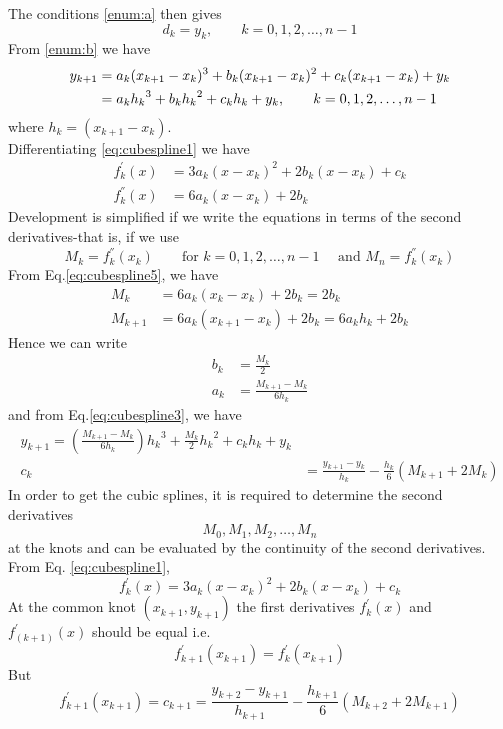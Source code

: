 \documentclass[12pt,class=book,crop=false]{standalone}
\begin{document}
The conditions \ref{enum:a} then gives
\[
	d_k=y_k,\qquad k=0,1,2,\dots,n-1
\]
From \ref{enum:b} we have
\begin{align}
	y_{k+1} & =a_k (x_{k+1}-x_k )^3+b_k (x_{k+1}-x_k )^2+c_k (x_{k+1}-x_k)+y_k\notag              \\
	        & =a_k {h_k}^3+b_k {h_k}^2+c_k h_k+y_k,\qquad k=0,1,2,\dots,n-1\label{eq:cubespline3}
\end{align}
where $ h_k=(x_{k+1}-x_k) $.\\
Differentiating \eqref{eq:cubespline1} we have
\begin{align}
	f_k^{'} (x) & =3a_k (x-x_k )^2+2b_k (x-x_k)+c_k\label{eq:cubespline4} \\
	f_k^{''}(x) & =6a_k(x-x_k)+2b_k \label{eq:cubespline5}
\end{align}
Development is simplified if we write the equations in terms of the second derivatives-that is, if we use
\[
	M_k=f^{''}_k(x_k) \qquad \text{for } k=0,1,2,\dots,n-1 \quad \text{ and } M_n=f^{''}_k(x_k)
\]
From Eq.\eqref{eq:cubespline5}, we have
\begin{align*}
	M_k     & =6a_k (x_k-x_k)+2b_k=2b_k              \\
	M_{k+1} & =6a_k (x_{k+1}-x_k)+2b_k=6a_k h_k+2b_k
\end{align*}
Hence we can write
\begin{align*}
	b_k & =\frac{M_k}{2}            \\
	a_k & =\frac{M_{k+1}-M_k}{6h_k}
\end{align*}
and from Eq.\eqref{eq:cubespline3}, we have
\begin{align*}
	y_{k+1}=\left(\frac{M_{k+1}-M_k}{6h_k} \right){h_k}^3+\frac{M_k}{2} {h_k}^2+c_k h_k+y_k \\
	c_k & =\frac{y_{k+1}-y_k}{h_k} -\frac{h_k}{6}(M_{k+1}+2M_k)
\end{align*}
In order to get the cubic splines, it is required to determine the second derivatives
\[
	M_0,M_1,M_2,\dots,M_n
\]
at the knots and can be evaluated by the continuity of the second derivatives.\\
From Eq. \eqref{eq:cubespline1},
\[
	f_k^{'} (x)=3a_k (x-x_k )^2+2b_k (x-x_k)+c_k
\]
At the common knot $ (x_{k+1},y_{k+1}) $ the first derivatives $ f_k^{'} (x) $ and $ f_(k+1)^{'} (x) $ should be equal i.e.
\[
	f_{k+1}^{'} (x_{k+1})=f_k^{'} (x_{k+1})
\]
But
\begin{equation}
	\label{eq:cubespline6a}
	f_{k+1}^{'} (x_{k+1})=c_{k+1}=\frac{y_{k+2}-y_{k+1}}{h_{k+1}}-\frac{h_{k+1}}{6}(M_{k+2}+2M_{k+1})
\end{equation}
\end{document}
